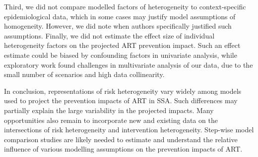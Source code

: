 Third, we did not compare modelled factors of heterogeneity to
context-specific epidemiological data,
which in some cases may justify model assumptions of homogeneity.
However, we did note when authors specifically justified such assumptions.
Finally, we did not estimate the effect size of
individual heterogeneity factors on the projected ART prevention impact.
Such an effect estimate could be biased by confounding factors in univariate analysis,
while exploratory work found challenges in multivariate analysis of our data,
due to the small number of scenarios and high data collinearity.
\par
In conclusion, representations of risk heterogeneity vary widely
among models used to project the prevention impacts of ART in SSA.
Such differences may partially explain the large variability in the projected impacts.
Many opportunities also remain to incorporate new and existing data on
the intersections of risk heterogeneity and intervention heterogeneity.
Step-wise model comparison studies are likely needed to
estimate and understand the relative influence
of various modelling assumptions on the prevention impacts of ART.
